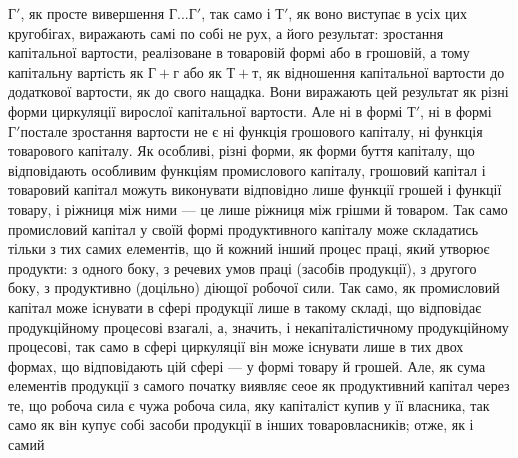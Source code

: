 $Г'$, як просте вивершення $Г... Г'$, так само і $Т'$, як воно виступає
в усіх цих кругобігах, виражають самі по собі не рух, а його результат:
зростання капітальної вартости, реалізоване в товаровій формі або в грошовій,
а тому капітальну вартість як $Г + г$ або як $Т + т$, як відношення
капітальної вартости до додаткової вартости, як до свого нащадка. Вони
виражають цей результат як різні форми циркуляції вирослої капітальної
вартости. Але ні в формі $Т'$, ні в формі $Г' п$остале зростання вартости
не є ні функція грошового капіталу, ні функція товарового капіталу. Як
особливі, різні форми, як форми буття капіталу, що відповідають особливим
функціям промислового капіталу, грошовий капітал і товаровий капітал
можуть виконувати відповідно лише функції грошей і функції товару,
і ріжниця між ними — це лише ріжниця між грішми й товаром. Так само
промисловий капітал у своїй формі продуктивного капіталу може складатись
тільки з тих самих елементів, що й кожний інший процес праці,
який утворює продукти: з одного боку, з речевих умов праці (засобів
продукції), з другого боку, з продуктивно (доцільно) діющої робочої
сили. Так само, як промисловий капітал може існувати в сфері продукції
лише в такому складі, що відповідає продукційному процесові взагалі,
а, значить, і некапіталістичному продукційному процесові, так само в сфері
циркуляції він може існувати лише в тих двох формах, що відповідають
цій сфері — у формі товару й грошей. Але, як сума елементів продукції
з самого початку виявляє сеое як продуктивний капітал через те, що робоча
сила є чужа робоча сила, яку капіталіст купив у її власника, так само як
він купує собі засоби продукції в інших товаровласників; отже, як і самий
\parbreak{}  %

